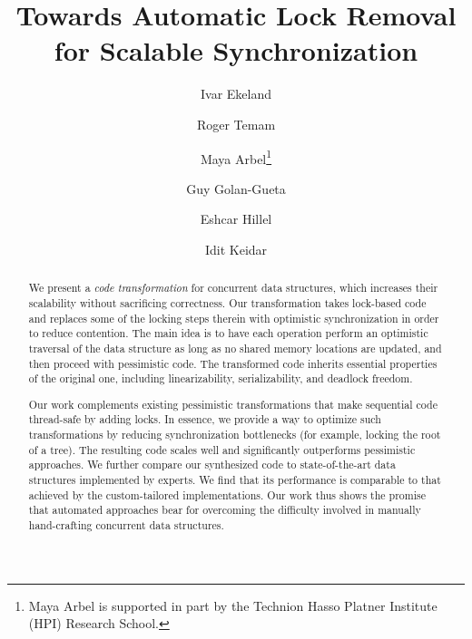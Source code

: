 \documentclass[oribibl]{llncs}
\begin{document}
\title{Towards Automatic Lock Removal\\ for Scalable Synchronization}

\author{Ivar Ekeland \and Roger Temam}
\author{
Maya Arbel\thanks{Maya Arbel is supported in part by the Technion Hasso Platner Institute (HPI) Research School.}\fnmsep{}
\and Guy Golan-Gueta  
\and Eshcar Hillel  
\and Idit Keidar\fnmsep{}} 



\maketitle

\begin{abstract}
We present a \emph{code transformation} for concurrent data structures,
which increases their scalability without sacrificing correctness.
Our transformation takes lock-based code and replaces some of the
locking steps therein with optimistic synchronization in order to reduce contention. The main idea is to
have each operation perform an optimistic traversal of the data structure
as long as no shared memory locations are updated, and then proceed with
pessimistic code. The transformed code inherits essential
properties of the original one, including linearizability, serializability,
and deadlock freedom.

Our work complements existing pessimistic transformations that make
sequential code thread-safe by adding locks.
In essence, we provide a way to optimize such transformations by reducing
synchronization bottlenecks (for example, locking the root of a tree).
The resulting code scales well and significantly outperforms
pessimistic approaches. We further compare our synthesized code to state-of-the-art
data structures implemented by experts.
We find that its performance is comparable %
to that achieved by the custom-tailored implementations.
Our work thus shows the promise that automated approaches
bear for overcoming the difficulty involved in manually
hand-crafting concurrent data structures.

\end{abstract}



\thispagestyle{empty}





%

%








%

%
%
\end{document}
